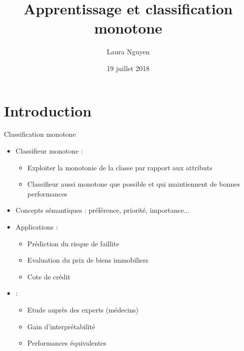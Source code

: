 \documentclass[usenames,dvipsnames]{beamer}
\title[Classification monotone]{Apprentissage et classification monotone}
\author{Laura Nguyen}
\institute{LFI}
\date{19 juillet 2018}
\begin{document}
\begin{frame}
  \titlepage
\end{frame}


\section{Introduction}

\begin{frame}{Classification monotone}
\begin{itemize}
\item Classifieur monotone :
    \begin{itemize}
        \item Exploiter la monotonie de la classe par rapport aux attributs
        \item Classifieur aussi monotone que possible et qui maintiennent de bonnes performances
    \end{itemize}
\item Concepts sémantiques : préférence, priorité, importance...
\item Applications : 
    \begin{itemize}
        \item Prédiction du risque de faillite
        \item Evaluation du prix de biens immobiliers
        \item Cote de crédit 
    \end{itemize}
\item \textcite{pazzani-acceptance} :
    \begin{itemize}
        \item Etude auprès des experts (médecins)
        \item Gain d'interprétabilité
        \item Performances équivalentes 
    \end{itemize}
\end{itemize}
\end{frame}
\end{document}
